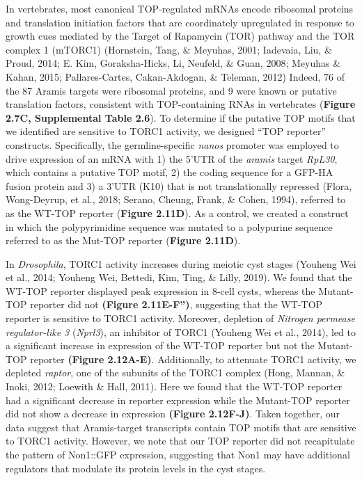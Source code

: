\documentclass[12pt,oneside]{reedthesis}
\begin{document}
In vertebrates, most canonical TOP-regulated mRNAs encode ribosomal
proteins and translation initiation factors that are coordinately
upregulated in response to growth cues mediated by the Target of
Rapamycin (TOR) pathway and the TOR complex 1 (mTORC1)
(Hornstein, Tang, \& Meyuhas, 2001; Iadevaia, Liu, \& Proud, 2014; E. Kim, Goraksha-Hicks, Li, Neufeld, \& Guan, 2008; Meyuhas \& Kahan, 2015; Pallares-Cartes, Cakan-Akdogan, \& Teleman, 2012) Indeed, 76 of the
87 Aramis targets were ribosomal proteins, and 9 were known or putative
translation factors, consistent with TOP-containing RNAs in vertebrates
(\textbf{Figure 2.7C, Supplemental Table 2.6}). To determine if the putative TOP
motifs that we identified are sensitive to TORC1 activity, we designed
``TOP reporter'' constructs. Specifically, the germline-specific \emph{nanos}
promoter was employed to drive expression of an mRNA with 1) the 5'UTR
of the \emph{aramis} target \emph{RpL30}, which contains a putative TOP motif, 2)
the coding sequence for a GFP-HA fusion protein and 3) a 3'UTR (K10)
that is not translationally repressed (Flora, Wong-Deyrup, et al., 2018; Serano, Cheung, Frank, \& Cohen, 1994), referred to as the WT-TOP
reporter (\textbf{Figure 2.11D}). As a control, we created a construct in which
the polypyrimidine sequence was mutated to a polypurine sequence
referred to as the Mut-TOP reporter (\textbf{Figure 2.11D}).

In \emph{Drosophila}, TORC1 activity increases during meiotic cyst stages
(Youheng Wei et al., 2014; Youheng Wei, Bettedi, Kim, Ting, \& Lilly, 2019). We found that the WT-TOP reporter displayed
peak expression in 8-cell cysts, whereas the Mutant-TOP reporter did not
\textbf{(Figure 2.11E-F'')}, suggesting that the WT-TOP reporter is sensitive to
TORC1 activity. Moreover, depletion of \emph{Nitrogen permease regulator-like
3} (\emph{Nprl3}), an inhibitor of TORC1 (Youheng Wei et al., 2014), led to a significant
increase in expression of the WT-TOP reporter but not the Mutant-TOP
reporter \textbf{(Figure 2.12A-E)}. Additionally, to attenuate TORC1 activity,
we depleted \emph{raptor}, one of the subunits of the TORC1 complex
(Hong, Mannan, \& Inoki, 2012; Loewith \& Hall, 2011). Here we found that the WT-TOP
reporter had a significant decrease in reporter expression while the
Mutant-TOP reporter did not show a decrease in expression \textbf{(Figure 2.12F-J)}.
Taken together, our data suggest that Aramis-target
transcripts contain TOP motifs that are sensitive to TORC1 activity.
However, we note that our TOP reporter did not recapitulate the pattern
of Non1::GFP expression, suggesting that Non1 may have additional
regulators that modulate its protein levels in the cyst stages.
\end{document}
